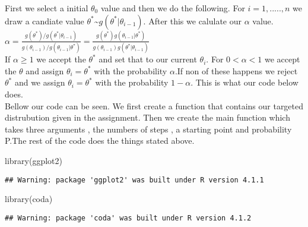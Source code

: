 \documentclass[
]{article}
\newenvironment{Shaded}{\begin{snugshade}}{\end{snugshade}}
\newcommand{\FunctionTok}[1]{\textcolor[rgb]{0.00,0.00,0.00}{#1}}
\newcommand{\NormalTok}[1]{#1}
\begin{document}
First we select a initial \(\theta_{0}\) value and then we do the
following. For \(i=1,.....,n\) we draw a candiate value
\(\theta^{*}\)\textasciitilde{}\(g(\theta^{*}|\theta_{i-1})\). After
this we calulate our \(\alpha\) value.\\
\(\alpha = \frac{g(\theta^{*})/g(\theta^{*}|\theta_{i-1}) }{g(\theta_{i-1})/g(\theta_{i-1}|\theta^{*})} = \frac{g(\theta^{*})g(\theta_{i-1}|\theta^{*}) }{g(\theta_{i-1}) g(\theta^{*}|\theta_{i-1})}\)\\
If \(\alpha \geq 1\) we accept the \(\theta^{*}\) and set that to our
current \(\theta_i\). For \(0 < \alpha <1\) we accept the \(\theta\) and
assign \(\theta_i=\theta^{*}\) with the probability \(\alpha\).If non of
these happens we reject \(\theta^{*}\) and we assign
\(\theta_i = \theta^{*}\) with the probability \(1-\alpha\). This is
what our code below does.\\
Bellow our code can be seen. We first create a function that contains
our targeted distrubution given in the assignment. Then we create the
main function which takes three arguments , the numbers of steps , a
starting point and probability P.The rest of the code does the things
stated above.

\begin{Shaded}
\begin{Highlighting}[]
\FunctionTok{library}\NormalTok{(ggplot2)}
\end{Highlighting}
\end{Shaded}

\begin{verbatim}
## Warning: package 'ggplot2' was built under R version 4.1.1
\end{verbatim}

\begin{Shaded}
\begin{Highlighting}[]
\FunctionTok{library}\NormalTok{(coda)}
\end{Highlighting}
\end{Shaded}

\begin{verbatim}
## Warning: package 'coda' was built under R version 4.1.2
\end{verbatim}
\end{document}
